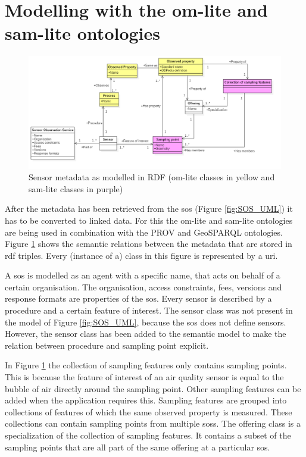 \section{Modelling with the om-lite and sam-lite ontologies}
\begin{figure}
	\centering
	\includegraphics[width=1\linewidth]{UML/SOS_Semantic_UML.PNG}
	\caption{Sensor metadata as modelled in RDF (om-lite classes in yellow and sam-lite classes in purple)}
	\label{fig:SOS_Semantic_UML}
\end{figure}

After the metadata has been retrieved from the \ac{sos} (Figure \ref{fig:SOS_UML}) it has to be converted to linked data. For this the om-lite and sam-lite ontologies are being used in combination with the PROV and GeoSPARQL ontologies. Figure \ref{fig:SOS_Semantic_UML} shows the semantic relations between the metadata that are stored in \ac{rdf} triples. Every (instance of a) class in this figure is represented by a \ac{uri}. 

A \ac{sos} is modelled as an agent with a specific name, that acts on behalf of a certain organisation. The organisation, access constraints, fees, versions and response formats are properties of the \ac{sos}. Every sensor is described by a procedure and a certain feature of interest. The sensor class was not present in the model of Figure \ref{fig:SOS_UML}, because the \ac{sos} does not define sensors. However, the sensor class has been added to the semantic model to make the relation between procedure and sampling point explicit. 

In Figure \ref{fig:SOS_Semantic_UML} the collection of sampling features only contains sampling points. This is because the feature of interest of an air quality sensor is equal to the bubble of air directly around the sampling point. Other sampling features can be added when the application requires this. Sampling features are grouped into collections of features of which the same observed property is measured. These collections can contain sampling points from multiple \aclp{sos}. The offering class is a specialization of the collection of sampling features. It contains a subset of the sampling points that are all part of the same offering at a particular \ac{sos}.

